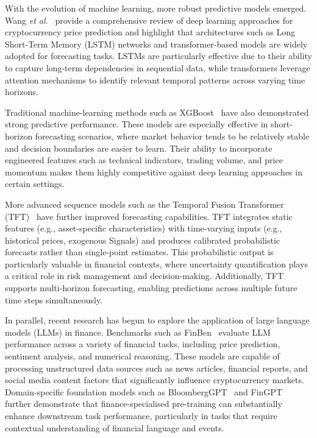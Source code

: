 \documentclass[12pt,a4paper,oneside,openany]{book}
\begin{document}
With the evolution of machine learning, more robust predictive models emerged. Wang \textit{et al.}~\cite{ref7} provide a comprehensive review of deep learning approaches for cryptocurrency price prediction and highlight that architectures such as Long Short-Term Memory (LSTM) networks and transformer-based models are widely adopted for forecasting tasks. LSTMs are particularly effective due to their ability to capture long-term dependencies in sequential data, while transformers leverage attention mechanisms to identify relevant temporal patterns across varying time horizons.

Traditional machine-learning methods such as XGBoost~\cite{ref4} have also demonstrated strong predictive performance. These models are especially effective in short-horizon forecasting scenarios, where market behavior tends to be relatively stable and decision boundaries are easier to learn. Their ability to incorporate engineered features such as technical indicators, trading volume, and price momentum makes them highly competitive against deep learning approaches in certain settings.

More advanced sequence models such as the Temporal Fusion Transformer (TFT)~\cite{ref21} have further improved forecasting capabilities. TFT integrates static features (e.g., asset-specific characteristics) with time-varying inputs (e.g., historical prices, exogenous Signals) and produces calibrated probabilistic forecasts rather than single-point estimates. This probabilistic output is particularly valuable in financial contexts, where uncertainty quantification plays a critical role in risk management and decision-making. Additionally, TFT supports multi-horizon forecasting, enabling predictions across multiple future time steps simultaneously.

In parallel, recent research has begun to explore the application of large language models (LLMs) in finance. Benchmarks such as FinBen~\cite{ref37} evaluate LLM performance across a variety of financial tasks, including price prediction, sentiment analysis, and numerical reasoning. These models are capable of processing unstructured data sources such as news articles, financial reports, and social media content factors that significantly influence cryptocurrency markets. Domain-specific foundation models such as BloombergGPT~\cite{ref38} and FinGPT~\cite{ref39} further demonstrate that finance-specialised pre-training can substantially enhance downstream task performance, particularly in tasks that require contextual understanding of financial language and events.
\end{document}

